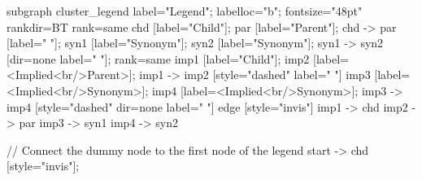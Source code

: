 \documentclass{article}
\begin{document}
{subgraph cluster_legend {
    label="Legend";
    labelloc="b";
    fontsize="48pt"
    rankdir=BT
    {
        rank=same
        chd [label="Child"];
        par [label="Parent"];
        chd -> par [label="                "];
        syn1 [label="Synonym"];
        syn2 [label="Synonym"];
        syn1 -> syn2 [dir=none label="                "];
    }
    {
        rank=same
        imp1 [label="Child"];
        imp2 [label=<Implied<br/>Parent>];
        imp1 -> imp2 [style="dashed" label="                "]
        imp3 [label=<Implied<br/>Synonym>];
        imp4 [label=<Implied<br/>Synonym>];
        imp3 -> imp4 [style="dashed" dir=none label="                "]
    }
    edge [style="invis"]
    imp1 -> chd
    imp2 -> par
    imp3 -> syn1
    imp4 -> syn2
}

// Connect the dummy node to the first node of the legend
start -> chd [style="invis"];
}
\end{document}
